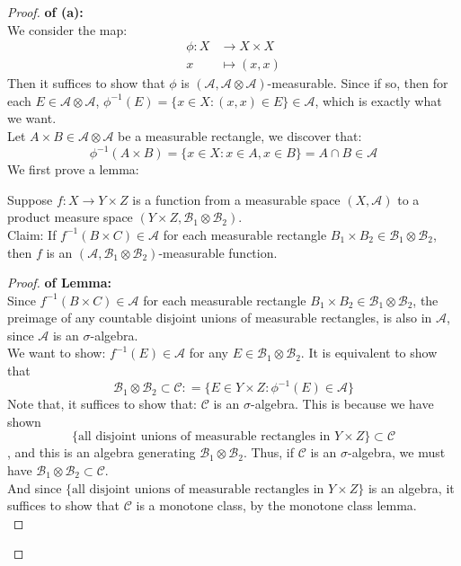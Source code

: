 \documentclass[lang=cn,11pt]{elegantbook}
\begin{document}
\begin{proof}
    \textbf{of (a):}\\
We consider the map: \begin{align}
    \phi: X &\to X \times X  \\
     x & \mapsto (x,x)
\end{align}
Then it suffices to show that $\phi$ is $(\mathcal{A},\mathcal{A}\otimes \mathcal{A})$-measurable. Since if so, then for each $E\in\mathcal{A}\otimes\mathcal{A}$, $\phi^{-1}(E)  =  \{x\in X : (x,x)\in E\}\in \mathcal{A}$, which is exactly what we want.\\
Let $A \times B \in  \mathcal{A}\otimes \mathcal{A} $ be a measurable rectangle, we discover that:
$$\phi^{-1}(A \times B)  =  \{x\in X : x \in A , x \in B\} = A \cap B \in \mathcal{A}$$
We first prove a lemma:
\begin{lemma}
    Suppose $f: X\to Y\times Z$ is a function from a measurable space $(X,\mathcal{A})$ to a product measure space $(Y\times Z, \mathcal{B}_1 \otimes \mathcal{B}_2)$.\\
  Claim: If $f^{-1}(B\times C)\in\mathcal{A}$ for each measurable rectangle $B_1 \times B_2 \in \mathcal{B}_1 \otimes \mathcal{B}_2$, then $f$ is an $(\mathcal{A}, \mathcal{B}_1 \otimes \mathcal{B}_2)$-measurable function.
\end{lemma}
\begin{proof}
    \textbf{of Lemma:}\\
     Since $f^{-1}(B\times C) \in \mathcal{A}$ for each measurable rectangle $B_1 \times B_2 \in \mathcal{B}_1 \otimes \mathcal{B}_2$, the preimage of any countable disjoint unions of measurable rectangles, is also in $\mathcal{A}$, since $\mathcal{A}$ is an $\sigma$-algebra.\\
     We want to show: $f^{-1}(E) \in\mathcal{A}$ for any $E \in  \mathcal{B}_1 \otimes \mathcal{B}_2$. It is equivalent to show that \[
\mathcal{B}_1 \otimes \mathcal{B}_2 \subset   \mathcal{C} : = \{ E \in Y\times Z  : \phi^{-1} (E) \in \mathcal{A}        \}
\]
Note that, it suffices to show that: $\mathcal{C}$ is an $\sigma$-algebra. This is because we have shown $$\{\text{all disjoint unions of measurable rectangles in }   Y\times Z\} \subset \mathcal{C}$$, and this is an algebra generating $\mathcal{B}_1 \otimes \mathcal{B}_2$. Thus, if $\mathcal{C}$ is an $\sigma$-algebra, we must have \(
   \mathcal{B}_1 \otimes \mathcal{B}_2 \subset \mathcal{C}
   \). \\
   And since $\{\text{all disjoint unions of measurable rectangles in }   Y\times Z\}$ is an algebra, it suffices to show that $\mathcal{C}$ is a monotone class, by the monotone class lemma.\\
   

\end{proof}
\end{proof}
\end{document}
